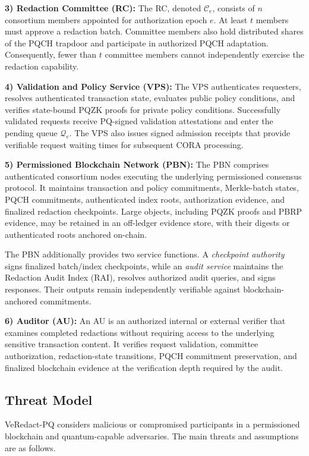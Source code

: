 \documentclass[lettersize,journal]{IEEEtran}
\begin{document}
\textbf{3) Redaction Committee (RC):}
The RC, denoted $\mathcal{C}_e$, consists of $n$ consortium members
appointed for authorization epoch $e$. At least $t$ members must approve
a redaction batch. Committee members also hold distributed shares of
the PQCH trapdoor and participate in authorized PQCH adaptation.
Consequently, fewer than $t$ committee members cannot independently
exercise the redaction capability.

\textbf{4) Validation and Policy Service (VPS):}
The VPS authenticates requesters, resolves authenticated transaction
state, evaluates public policy conditions, and verifies state-bound
PQZK proofs for private policy conditions. Successfully validated
requests receive PQ-signed validation attestations and enter the
pending queue $\mathcal{Q}_e$. The VPS also issues signed admission
receipts that provide verifiable request waiting times for subsequent
CORA processing.

\textbf{5) Permissioned Blockchain Network (PBN):}
The PBN comprises authenticated consortium nodes executing the
underlying permissioned consensus protocol. It maintains transaction
and policy commitments, Merkle-batch states, PQCH commitments,
authenticated index roots, authorization evidence, and finalized
redaction checkpoints. Large objects, including PQZK proofs and PBRP
evidence, may be retained in an off-ledger evidence store, with their
digests or authenticated roots anchored on-chain.

The PBN additionally provides two service functions. A
\emph{checkpoint authority} signs finalized batch/index checkpoints,
while an \emph{audit service} maintains the Redaction Audit Index (RAI),
resolves authorized audit queries, and signs responses. Their outputs
remain independently verifiable against blockchain-anchored
commitments.

\textbf{6) Auditor (AU):}
An AU is an authorized internal or external verifier that examines
completed redactions without requiring access to the underlying
sensitive transaction content. It verifies request validation,
committee authorization, redaction-state transitions, PQCH commitment
preservation, and finalized blockchain evidence at the verification
depth required by the audit.

\subsection{Threat Model}
\label{subsec:threat}

VeRedact-PQ considers malicious or compromised participants in a
permissioned blockchain and quantum-capable adversaries. The main
threats and assumptions are as follows.
\end{document}

